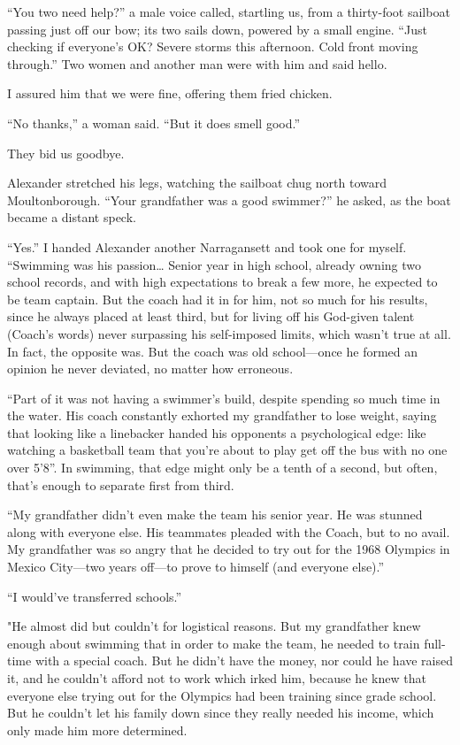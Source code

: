 ``You two need help?'' a male voice called, startling us, from a
thirty-foot sailboat passing just off our bow; its two sails down,
powered by a small engine. ``Just checking if everyone's OK? Severe
storms this afternoon. Cold front moving through.'' Two women and
another man were with him and said hello.

I assured him that we were fine, offering them fried chicken.

``No thanks,'' a woman said. ``But it does smell good.''

They bid us goodbye.

Alexander stretched his legs, watching the sailboat chug north toward
Moultonborough. ``Your grandfather was a good swimmer?'' he asked, as
the boat became a distant speck.

``Yes.'' I handed Alexander another Narragansett and took one for
myself. ``Swimming was his passion\ldots{} Senior year in high school,
already owning two school records, and with high expectations to break a
few more, he expected to be team captain. But the coach had it in for
him, not so much for his results, since he always placed at least third,
but for living off his God-given talent (Coach's words) never surpassing
his self-imposed limits, which wasn't true at all. In fact, the opposite
was. But the coach was old school---once he formed an opinion he never
deviated, no matter how erroneous.

``Part of it was not having a swimmer's build, despite spending so much
time in the water. His coach constantly exhorted my grandfather to lose
weight, saying that looking like a linebacker handed his opponents a
psychological edge: like watching a basketball team that you're about to
play get off the bus with no one over 5'8''. In swimming, that edge
might only be a tenth of a second, but often, that's enough to separate
first from third.

``My grandfather didn't even make the team his senior year. He was
stunned along with everyone else. His teammates pleaded with the Coach,
but to no avail. My grandfather was so angry that he decided to try out
for the 1968 Olympics in Mexico City---two years off---to prove to
himself (and everyone else).''

``I would've transferred schools.''

"He almost did but couldn't for logistical reasons. But my grandfather
knew enough about swimming that in order to make the team, he needed to
train full-time with a special coach. But he didn't have the money, nor
could he have raised it, and he couldn't afford not to work which irked
him, because he knew that everyone else trying out for the Olympics had
been training since grade school. But he couldn't let his family down
since they really needed his income, which only made him more
determined.

